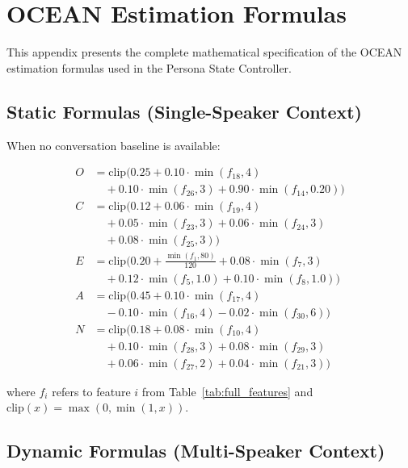 \chapter{OCEAN Estimation Formulas}
\label{app:scoring}

This appendix presents the complete mathematical specification of the OCEAN estimation formulas used in the Persona State Controller.

\section{Static Formulas (Single-Speaker Context)}

When no conversation baseline is available:

\begin{align}
    O &= \text{clip}\Big(0.25 + 0.10 \cdot \min(f_{18}, 4) \nonumber \\
      &\quad + 0.10 \cdot \min(f_{26}, 3) + 0.90 \cdot \min(f_{14}, 0.20)\Big) \\[4pt]
    C &= \text{clip}\Big(0.12 + 0.06 \cdot \min(f_{19}, 4) \nonumber \\
      &\quad + 0.05 \cdot \min(f_{23}, 3) + 0.06 \cdot \min(f_{24}, 3) \nonumber \\
      &\quad + 0.08 \cdot \min(f_{25}, 3)\Big) \\[4pt]
    E &= \text{clip}\Big(0.20 + \frac{\min(f_1, 80)}{120} + 0.08 \cdot \min(f_7, 3) \nonumber \\
      &\quad + 0.12 \cdot \min(f_5, 1.0) + 0.10 \cdot \min(f_8, 1.0)\Big) \\[4pt]
    A &= \text{clip}\Big(0.45 + 0.10 \cdot \min(f_{17}, 4) \nonumber \\
      &\quad - 0.10 \cdot \min(f_{16}, 4) - 0.02 \cdot \min(f_{30}, 6)\Big) \\[4pt]
    N &= \text{clip}\Big(0.18 + 0.08 \cdot \min(f_{10}, 4) \nonumber \\
      &\quad + 0.10 \cdot \min(f_{28}, 3) + 0.08 \cdot \min(f_{29}, 3) \nonumber \\
      &\quad + 0.06 \cdot \min(f_{27}, 2) + 0.04 \cdot \min(f_{21}, 3)\Big)
\end{align}

\noindent where $f_i$ refers to feature $i$ from Table~\ref{tab:full_features} and $\text{clip}(x) = \max(0, \min(1, x))$.

\section{Dynamic Formulas (Multi-Speaker Context)}

